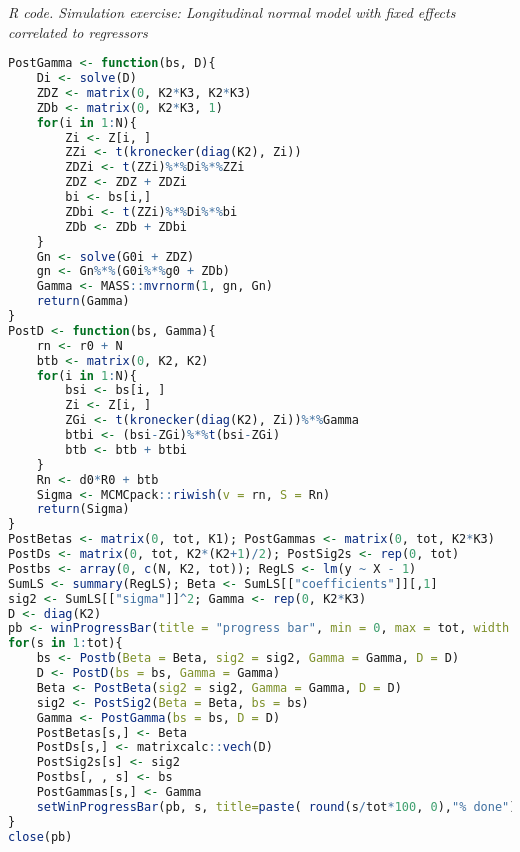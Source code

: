 \begin{enumerate}[leftmargin=*]
\begin{tcolorbox}[enhanced,width=4.67in,center upper,
	fontupper=\large\bfseries,drop shadow southwest,sharp corners]
	\textit{R code. Simulation exercise: Longitudinal normal model with fixed effects correlated to regressors}
	\begin{VF}
		\begin{lstlisting}[language=R]
PostGamma <- function(bs, D){
	Di <- solve(D)
	ZDZ <- matrix(0, K2*K3, K2*K3)
	ZDb <- matrix(0, K2*K3, 1)
	for(i in 1:N){
		Zi <- Z[i, ]
		ZZi <- t(kronecker(diag(K2), Zi))
		ZDZi <- t(ZZi)%*%Di%*%ZZi
		ZDZ <- ZDZ + ZDZi
		bi <- bs[i,]
		ZDbi <- t(ZZi)%*%Di%*%bi
		ZDb <- ZDb + ZDbi
	}
	Gn <- solve(G0i + ZDZ)
	gn <- Gn%*%(G0i%*%g0 + ZDb)
	Gamma <- MASS::mvrnorm(1, gn, Gn)
	return(Gamma)
}
PostD <- function(bs, Gamma){
	rn <- r0 + N
	btb <- matrix(0, K2, K2)
	for(i in 1:N){
		bsi <- bs[i, ]
		Zi <- Z[i, ]
		ZGi <- t(kronecker(diag(K2), Zi))%*%Gamma
		btbi <- (bsi-ZGi)%*%t(bsi-ZGi)
		btb <- btb + btbi
	}
	Rn <- d0*R0 + btb
	Sigma <- MCMCpack::riwish(v = rn, S = Rn)
	return(Sigma)
}
PostBetas <- matrix(0, tot, K1); PostGammas <- matrix(0, tot, K2*K3)
PostDs <- matrix(0, tot, K2*(K2+1)/2); PostSig2s <- rep(0, tot)
Postbs <- array(0, c(N, K2, tot)); RegLS <- lm(y ~ X - 1)
SumLS <- summary(RegLS); Beta <- SumLS[["coefficients"]][,1]
sig2 <- SumLS[["sigma"]]^2; Gamma <- rep(0, K2*K3)
D <- diag(K2)
pb <- winProgressBar(title = "progress bar", min = 0, max = tot, width = 300)
for(s in 1:tot){
	bs <- Postb(Beta = Beta, sig2 = sig2, Gamma = Gamma, D = D)
	D <- PostD(bs = bs, Gamma = Gamma)
	Beta <- PostBeta(sig2 = sig2, Gamma = Gamma, D = D)
	sig2 <- PostSig2(Beta = Beta, bs = bs)
	Gamma <- PostGamma(bs = bs, D = D) 
	PostBetas[s,] <- Beta
	PostDs[s,] <- matrixcalc::vech(D)
	PostSig2s[s] <- sig2
	Postbs[, , s] <- bs
	PostGammas[s,] <- Gamma
	setWinProgressBar(pb, s, title=paste( round(s/tot*100, 0),"% done"))
}
close(pb)
\end{lstlisting}
	\end{VF}
\end{tcolorbox}


\end{enumerate}
